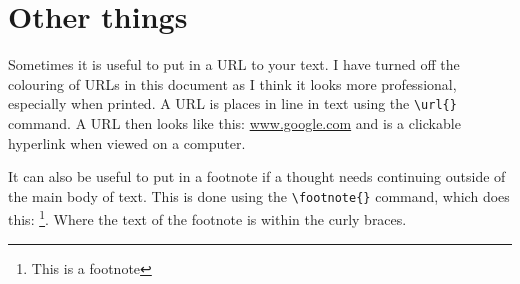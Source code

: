 \section{Other things}
Sometimes it is useful to put in a URL to your text. I have turned off the colouring of URLs in this document as I think it looks more professional, especially when printed. A URL is places in line in text using the \verb+\url{}+ command. A URL then looks like this: \url{www.google.com} and is a clickable hyperlink when viewed on a computer. 

It can also be useful to put in a footnote if a thought needs continuing outside of the main body of text. This is done using the \verb+\footnote{}+ command, which does this: \footnote{This is a footnote}. Where the text of the footnote is within the curly braces.

